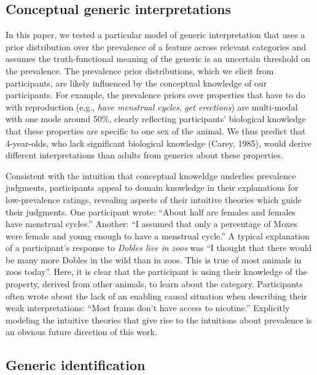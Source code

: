 \documentclass[,man,floatsintext]{apa6}
\theoremstyle{definition}
\theoremstyle{definition}
\theoremstyle{definition}
\theoremstyle{remark}
\begin{document}
\hypertarget{conceptual-generic-interpretations}{%
\subsection{Conceptual generic
interpretations}\label{conceptual-generic-interpretations}}

In this paper, we tested a particular model of generic interpretation
that uses a prior distribution over the prevalence of a feature across
relevant categories and assumes the truth-functional meaning of the
generic is an uncertain threshold on the prevalence. The prevalence
prior distributions, which we elicit from participants, are likely
influenced by the conceptual knowledge of our participants. For example,
the prevalence priors over properties that have to do with reproduction
(e.g., \emph{have menstrual cycles}, \emph{get erections}) are
multi-modal with one mode around 50\%, clearly reflecting participants'
biological knowledge that these properties are specific to one sex of
the animal. We thus predict that 4-year-olds, who lack significant
biological knowledge (Carey, 1985), would derive different
interpretations than adults from generics about these properties.

Consistent with the intuition that conceptual knoweldge underlies
prevalence judgments, participants appeal to domain knowledge in their
explanations for low-prevalence ratings, revealing aspects of their
intuitive theories which guide their judgments. One participant wrote:
\enquote{About half are females and females have menstrual cycles.}
Another: \enquote{I assumed that only a percentage of Moxes were female
and young enough to have a menstrual cycle.} A typical explanation of a
participant's response to \emph{Dobles live in zoos} was \enquote{I
thought that there would be many more Dobles in the wild than in zoos.
This is true of most animals in zoos today}. Here, it is clear that the
participant is using their knowledge of the property, derived from other
animals, to learn about the category. Participants often wrote about the
lack of an enabling causal situation when describing their weak
interpretations: \enquote{Most frams don't have access to nicotine.}
Explicitly modeling the intuitive theories that give rise to the
intuitions about prevalence is an obvious future direction of this work.

\hypertarget{generic-identification}{%
\subsection{Generic identification}\label{generic-identification}}
\end{document}
